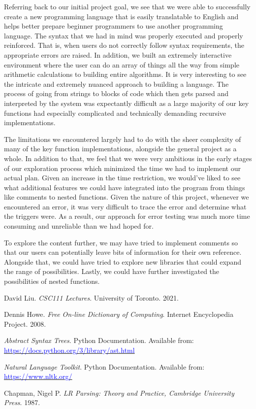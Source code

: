 \documentclass[fontsize=11pt]{article}
\newcommand{\blue}[1]{\textcolor{blue}{#1}}
\newcommand{\link}[1]{\href{#1}{\blue{#1}}}
\begin{document}
Referring back to our initial project goal, we see that we were able to successfully create a new programming language that is easily translatable to English and helps better prepare beginner programmers to use another programming language. The syntax that we had in mind was properly executed and properly reinforced. That is, when users do not correctly follow syntax requirements, the appropriate errors are raised. In addition, we built an extremely interactive environment where the user can do an array of things all the way from simple arithmetic calculations to building entire algorithms. It is very interesting to see the intricate and extremely nuanced approach to building a language. The process of going from strings to blocks of code which then gets parsed and interpreted by the system was expectantly difficult as a large majority of our key functions had especially complicated and technically demanding recursive implementations.

The limitations we encountered largely had to do with the sheer complexity of many of the key function implementations, alongside the general project as a whole. In addition to that, we feel that we were very ambitious in the early stages of our exploration process which minimized the time we had to implement our actual plan. Given an increase in the time restriction, we would've liked to see what additional features we could have integrated into the program from things like comments to nested functions. Given the nature of this project, whenever we encountered an error, it was very difficult to trace the error and determine what the triggers were. As a result, our approach for error testing was much more time consuming and unreliable than we had hoped for. 

To explore the content further, we may have tried to implement comments so that our users can potentially leave bits of information for their own reference. Alongside that, we could have tried to explore new libraries that could expand the range of possibilities. Lastly, we could have further investigated the possibilities of nested functions. 

\begin{thebibliography}{9}

David Liu. \textit{CSC111 Lectures}. University of Toronto. 2021.

Dennis Howe. \textit{Free On-line Dictionary of Computing}. Internet Encyclopedia Project. 2008.

\textit{Abstract Syntax Trees}. Python Documentation. Available from: \link{https://docs.python.org/3/library/ast.html}

\textit{Natural Language Toolkit}. Python Documentation. Available from: \link{https://www.nltk.org/}

Chapman, Nigel P. \textit{LR Parsing: Theory and Practice, Cambridge University Press}. 1987.

\end{thebibliography}
\end{document}
